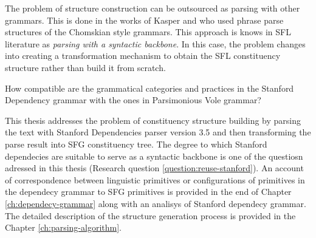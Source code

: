 
The problem of structure construction can be outsourced as parsing with other grammars. This is done in the works of Kasper \citet{Kasper1988} and \citet{Honnibal2004a, Honnibal2007} who used phrase parse structures of the Chomskian style grammars. This approach is knows in SFL literature as \textit{parsing with a syntactic backbone}. In this case, the problem changes into creating a transformation mechanism to obtain the SFL constituency structure rather than build it from scratch. 


\begin{question}\label{question:reuse-stanford}
    How compatible are the grammatical categories and practices in the Stanford Dependency grammar with the ones in Parsimonious Vole grammar?
\end{question}

This thesis addresses the problem of constituency structure building by parsing the text with Stanford Dependencies parser version 3.5 \citep{Marneffe2008a,Marneffe2008, Marneffe2014} and then transforming the parse result into SFG constituency tree. The degree to which Stanford dependecies are suitable to serve as a syntactic backbone is one of the questiosn adressed in this thesis (Research question \ref{question:reuse-stanford}). %
An account of correspondence between linguistic primitives or configurations of primitives in the dependecy grammar to SFG primitives is provided in the end of Chapter \ref{ch:dependecy-grammar} along with an analisys of Stanford dependecy grammar. The detailed description of the structure generation process is provided in the Chapter \ref{ch:parsing-algorithm}.

